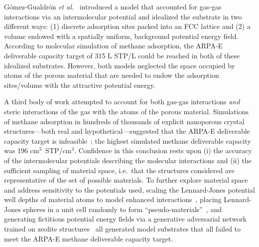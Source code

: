G\'omez-Gualdr\'on \emph{et al.}~\cite{gomez2017impact} introduced a model that accounted for gas-gas interactions via an intermolecular potential and idealized the substrate in two different ways: (1) discrete adsorption sites packed into an FCC lattice and (2) a volume endowed with a spatially uniform, background potential energy field. According to molecular simulation of methane adsorption, the ARPA-E deliverable capacity target of 315 L STP/L could be reached in both of these idealized substrates.
However, both models neglected the space occupied by atoms of the porous material that are needed to endow the adsorption sites/volume with the attractive potential energy. %

A third body of work attempted to account for both gas-gas interactions \emph{and} steric interactions of the gas with the atoms of the porous material.
Simulations of methane adsorption in hundreds of thousands of explicit nanoporous crystal structures---both real and hypothetical---suggested that the ARPA-E deliverable capacity target is infeasible~\cite{simon2015materials}; the highest simulated methane deliverable capacity was 196 cm$^3$~STP/cm$^3$. Confidence in this conclusion rests upon (i) the accuracy of the intermolecular potentials describing the molecular interactions and (ii) the sufficient sampling of material space, i.e.\ that the structures considered are representative of the set of possible materials. To further explore material space and address sensitivity to the potentials used, scaling the Lennard-Jones potential well depths of material atoms to model enhanced interactions~\cite{gomez2014exploring}, placing Lennard-Jones spheres in a unit cell randomly to form ``pseudo-materials''~\cite{kaija2018high}, and generating fictitious potential energy fields via a generative adversarial network trained on zeolite structures~\cite{lee2019predicting} all generated model substrates that all failed to meet the ARPA-E methane deliverable capacity target.

